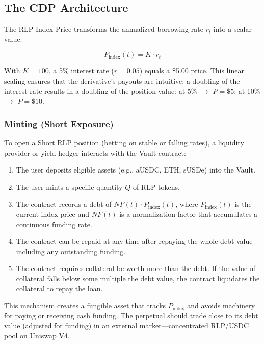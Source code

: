 \documentclass[12pt]{article}
\begin{document}
\subsection{The CDP Architecture}

The RLP Index Price transforms the annualized borrowing rate $r_t$ into a scalar value:

\begin{equation}
    P_{\text{index}}(t) = K \cdot r_t
\end{equation}

With $K=100$, a 5\% interest rate ($r=0.05$) equals a \$5.00 price. This linear scaling ensures that the derivative's payouts are intuitive: a doubling of the interest rate results in a doubling of the position value: at 5\% $\rightarrow$ $P = \$5$; at 10\% $\rightarrow$ $P = \$10$.

\subsubsection{Minting (Short Exposure)}

To open a Short RLP position (betting on stable or falling rates), a liquidity provider or yield hedger interacts with the Vault contract:

\begin{enumerate}
    \item The user deposits eligible assets (e.g., aUSDC, ETH, sUSDe) into the Vault.
    \item The user mints a specific quantity $Q$ of RLP tokens.
    \item The contract records a debt of $NF(t) \cdot P_{\text{index}}(t)$, where $P_{\text{index}}(t)$ is the current index price and $NF(t)$ is a normalization factor that accumulates a continuous funding rate.
    \item The contract can be repaid at any time after repaying the whole debt value including any outstanding funding.
    \item The contract requires collateral be worth more than the debt. If the value of collateral falls below some multiple the debt value, the contract liquidates the collateral to repay the loan.
\end{enumerate}

This mechanism creates a fungible asset that tracks $P_{\text{index}}$ and avoids machinery for paying or receiving cash funding. The perpetual should trade close to its debt value (adjusted for funding) in an external market---concentrated RLP/USDC pool on Uniswap V4.
\end{document}
